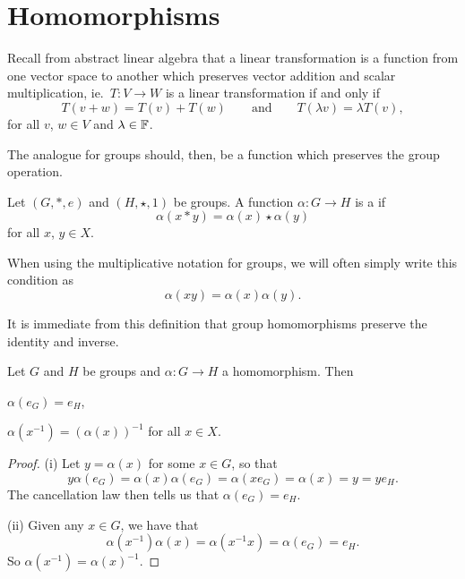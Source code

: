 \section{Homomorphisms}

Recall from abstract linear algebra that a linear transformation is a 
function from one vector space to another which preserves vector 
addition and scalar multiplication, ie.\ $T: V \to W$ is a linear 
transformation if and only if
\[
  T(v+w) = T(v) + T(w) \qquad \text{and} \qquad T(\lambda v) = 
  \lambda T(v),
\]
for all $v$, $w \in V$ and $\lambda \in \mathbb{F}$.

The analogue for groups should, then, be a function which preserves 
the group operation.

\begin{definition}
  Let $(G, \ast, e)$ and $(H, \star, 1)$ be groups.  A function
  $\alpha: G \to H$ is a  if
  \[
    \alpha(x \ast y) = \alpha(x) \star \alpha(y)
  \]
  for all $x$, $y \in X$.
\end{definition}
  
When using the multiplicative notation for groups, we will often 
simply write this condition as
\[
  \alpha(xy) = \alpha(x)\alpha(y).
\]

It is immediate from this definition that group homomorphisms preserve 
the identity and inverse.

\begin{proposition}
  Let $G$ and $H$ be groups and $\alpha: G \to H$ a homomorphism. 
  Then
  \begin{theoremenum}
    \item $\alpha(e_{G}) = e_{H}$,

    \item $\alpha(x^{-1}) = (\alpha(x))^{-1}$ for all $x \in X$.
  \end{theoremenum}
\end{proposition}
\begin{proof}
  (i) Let $y = \alpha(x)$ for some $x \in G$, so that
  \[
    y \alpha(e_{G}) = \alpha(x)\alpha(e_{G}) = 
    \alpha(xe_{G}) = \alpha(x) = y = y e_{H}.
  \]
  The cancellation law then tells us that $\alpha(e_{G}) = e_{H}$.
    
  (ii) Given any $x \in G$, we have that
  \[
    \alpha(x^{-1})\alpha(x) = \alpha(x^{-1}x) = \alpha(e_{G}) = e_{H}.
  \]
  So $\alpha(x^{-1}) = \alpha(x)^{-1}$.
\end{proof}

